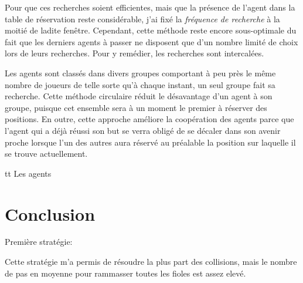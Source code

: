 \documentclass[letterpaper]{article}
\begin{document}
Pour que ces recherches soient efficientes, mais que la pr\'esence de l'agent dans la table de r\'eservation reste consid\'erable, j'ai fix\'e la \textit{fr\'equence de recherche} \`a la moiti\'e de ladite fen\^etre.
Cependant, cette m\'ethode reste encore sous-optimale du fait que les derniers agents \`a passer ne disposent que d'un nombre limit\'e de choix lors de leurs recherches.
Pour y rem\'edier, les recherches sont intercal\'ees. 

Les agents sont class\'es dans divers groupes comportant \`a peu pr\`es le m\^eme nombre de joueurs de telle sorte qu'\`a chaque instant, un seul groupe fait sa recherche. 
Cette m\'ethode circulaire r\'eduit le d\'esavantage d'un agent \`a son groupe, puisque cet ensemble sera \`a un moment le premier \`a r\'eserver des positions.
En outre, cette approche am\'eliore la coop\'eration des agents parce que l'agent qui a d\'ej\`a r\'eussi son but se verra oblig\'e de se d\'ecaler dans son avenir proche lorsque l'un des autres aura r\'eserv\'e au pr\'ealable la position sur laquelle il se trouve actuellement.



tt 
Les agents 

\section{Conclusion}
Premi\`ere strat\'egie:

Cette strat\'egie m'a permis de r\'esoudre la plus part des collisions, mais le nombre de pas en moyenne pour rammasser toutes les fioles est assez elev\'e.
\end{document}
